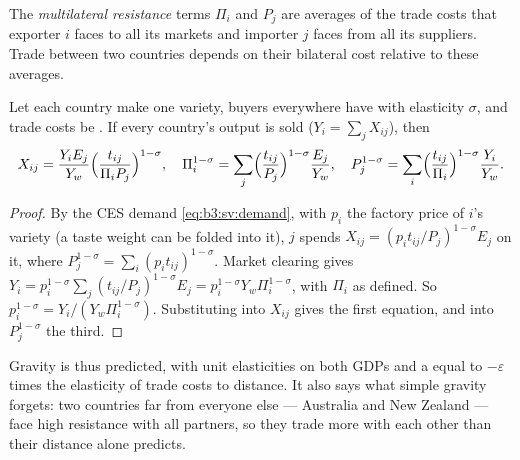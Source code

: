 \begin{definition}\label{def:b3:gravity:multilateral-resistance}
The \emph{multilateral resistance} terms $\Pi_i$ and $P_j$ are averages of the
trade costs that exporter $i$ faces to all its markets and importer $j$ faces from
all its suppliers. Trade between two countries depends on their bilateral cost
relative to these averages.
\end{definition}

\begin{proposition}\label{prop:b3:gravity:structural}
Let each country make one variety, buyers everywhere have  with
elasticity $\sigma$, and trade costs be . If every country's output is sold
($Y_i = \sum_j X_{ij}$), then
\begin{equation}\label{eq:b3:gr:structural}
  X_{ij} = \frac{Y_i E_j}{Y_w} \Bigl(\frac{t_{ij}}{\Pi_i P_j}\Bigr)^{1-\sigma}, \quad
  \Pi_i^{1-\sigma} = \sum_j \Bigl(\frac{t_{ij}}{P_j}\Bigr)^{1-\sigma}\frac{E_j}{Y_w}, \quad
  P_j^{1-\sigma} = \sum_i \Bigl(\frac{t_{ij}}{\Pi_i}\Bigr)^{1-\sigma}\frac{Y_i}{Y_w} .
\end{equation}
\end{proposition}

\begin{proof}
By the CES demand \eqref{eq:b3:sv:demand}, with $p_i$ the factory price of $i$'s
variety (a taste weight can be folded into it), $j$ spends $X_{ij} = (p_it_{ij}/P_j)^{1-\sigma}E_j$
on it, where $P_j^{1-\sigma} = \sum_i (p_it_{ij})^{1-\sigma}$. Market clearing gives $Y_i = p_i^{1-\sigma}
\sum_j (t_{ij}/P_j)^{1-\sigma}E_j = p_i^{1-\sigma} Y_w\Pi_i^{1-\sigma}$, with $\Pi_i$ as defined. So
$p_i^{1-\sigma} = Y_i/(Y_w\Pi_i^{1-\sigma})$. Substituting into $X_{ij}$ gives the first equation,
and into $P_j^{1-\sigma}$ the third.
\end{proof}

Gravity is thus predicted, with unit elasticities on both GDPs and a  equal to $-\varepsilon$ times the elasticity of trade costs to distance. It
also says what simple gravity forgets: two countries far from everyone else ---
Australia and New Zealand --- face high resistance with all partners, so they trade
more with each other than their distance alone predicts.

